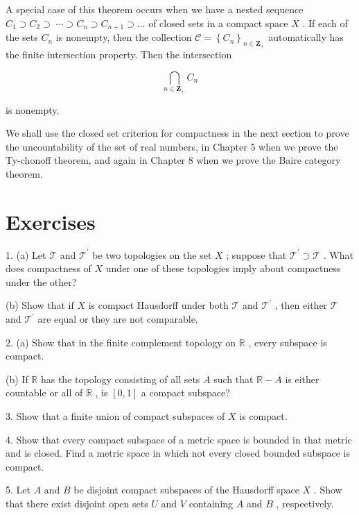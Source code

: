\documentclass[10pt]{article}
\begin{document}
A special case of this theorem occurs when we have a nested sequence \({C}_{1} \supset  {C}_{2} \supset \; \cdots  \supset  {C}_{n} \supset  {C}_{n + 1} \supset  \ldots\) of closed sets in a compact space \(X\) . If each of the sets \({C}_{n}\) is nonempty, then the collection \(\mathcal{C} = {\left\{  {C}_{n}\right\}  }_{n \in  {\mathbf{Z}}_{ + }}\) automatically has the finite intersection property. Then the intersection

\[
\mathop{\bigcap }\limits_{{n \in  {\mathbf{Z}}_{ + }}}{C}_{n}
\]

is nonempty.

We shall use the closed set criterion for compactness in the next section to prove the uncountability of the set of real numbers, in Chapter 5 when we prove the Ty-chonoff theorem, and again in Chapter 8 when we prove the Baire category theorem.

\section*{Exercises}

1. (a) Let \(\mathcal{T}\) and \({\mathcal{T}}^{\prime }\) be two topologies on the set \(X\) ; suppose that \({\mathcal{T}}^{\prime } \supset  \mathcal{T}\) . What does compactness of \(X\) under one of these topologies imply about compactness under the other?

(b) Show that if \(X\) is compact Hausdorff under both \(\mathcal{T}\) and \({\mathcal{T}}^{\prime }\) , then either \(\mathcal{T}\) and \({\mathcal{T}}^{\prime }\) are equal or they are not comparable.

2. (a) Show that in the finite complement topology on \(\mathbb{R}\) , every subspace is compact.

(b) If \(\mathbb{R}\) has the topology consisting of all sets \(A\) such that \(\mathbb{R} - A\) is either countable or all of \(\mathbb{R}\) , is \(\left\lbrack  {0,1}\right\rbrack\) a compact subspace?

3. Show that a finite union of compact subspaces of \(X\) is compact.

4. Show that every compact subspace of a metric space is bounded in that metric and is closed. Find a metric space in which not every closed bounded subspace is compact.

5. Let \(A\) and \(B\) be disjoint compact subspaces of the Hausdorff space \(X\) . Show that there exist disjoint open sets \(U\) and \(V\) containing \(A\) and \(B\) , respectively.
\end{document}
